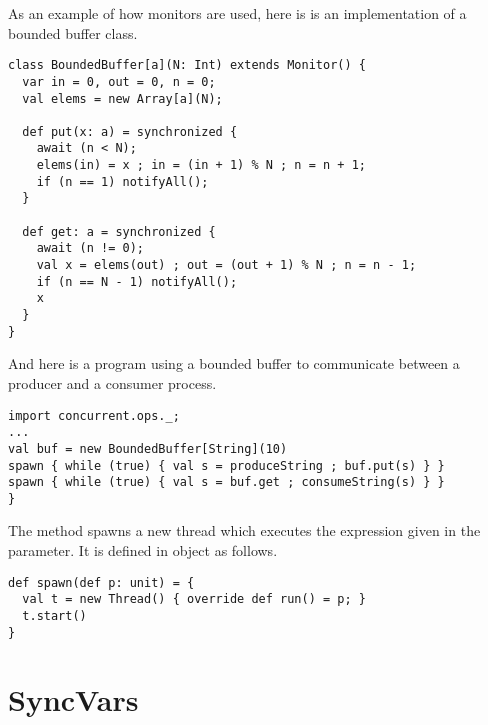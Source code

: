 {As an example of how monitors are used, here is is an implementation
of a bounded buffer class.
\begin{lstlisting}
class BoundedBuffer[a](N: Int) extends Monitor() {
  var in = 0, out = 0, n = 0;
  val elems = new Array[a](N);

  def put(x: a) = synchronized {
    await (n < N);
    elems(in) = x ; in = (in + 1) % N ; n = n + 1;
    if (n == 1) notifyAll();
  }

  def get: a = synchronized {
    await (n != 0);
    val x = elems(out) ; out = (out + 1) % N ; n = n - 1;
    if (n == N - 1) notifyAll();
    x
  }
}
\end{lstlisting}
And here is a program using a bounded buffer to communicate between a
producer and a consumer process.
\begin{lstlisting}
import concurrent.ops._;
...
val buf = new BoundedBuffer[String](10)
spawn { while (true) { val s = produceString ; buf.put(s) } }
spawn { while (true) { val s = buf.get ; consumeString(s) } }
}
\end{lstlisting}
The  method spawns a new thread which executes the
expression given in the parameter. It is defined in object 
as follows.
\begin{lstlisting}
def spawn(def p: unit) = {
  val t = new Thread() { override def run() = p; }
  t.start()
}
\end{lstlisting}


\section{SyncVars}

}
